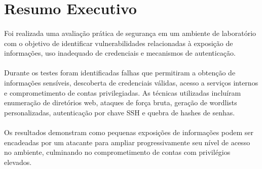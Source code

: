 \section{Resumo Executivo}

\paragraph{}
Foi realizada uma avaliação prática de segurança em um ambiente de laboratório
com o objetivo de identificar vulnerabilidades relacionadas à exposição de
informações, uso inadequado de credenciais e mecanismos de autenticação.

\paragraph{}
Durante os testes foram identificadas falhas que permitiram a obtenção de
informações sensíveis, descoberta de credenciais válidas, acesso a serviços
internos e comprometimento de contas privilegiadas. As técnicas utilizadas
incluíram enumeração de diretórios web, ataques de força bruta, geração de
wordlists personalizadas, autenticação por chave SSH e quebra de hashes de
senhas.

\paragraph{}
Os resultados demonstram como pequenas exposições de informações podem ser
encadeadas por um atacante para ampliar progressivamente seu nível de acesso no
ambiente, culminando no comprometimento de contas com privilégios elevados.

